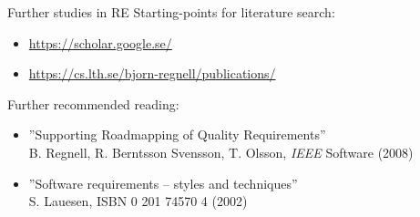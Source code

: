 \documentclass{simpleslides}
\begin{document}
\begin{frame}[fragile]{Further studies in RE}
  Starting-points for literature search:

\begin{itemize}\footnotesize
\item \url{https://scholar.google.se/}\\
\item \url{https://cs.lth.se/bjorn-regnell/publications/}\\
\end{itemize}


Further recommended reading: 
\begin{itemize}\footnotesize
\item ''Supporting Roadmapping of Quality Requirements'' \\ B. Regnell, R. Berntsson Svensson, T. Olsson, \emph{IEEE} Software (2008) 
\item ''Software requirements -- styles and techniques'' \\ S. Lauesen, ISBN 0 201 74570 4  (2002) 
\end{itemize}

\end{frame}
\end{document}
